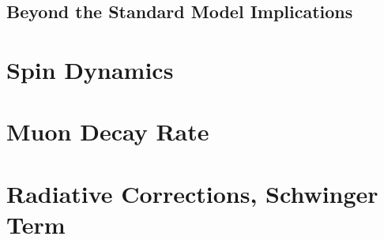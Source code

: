 \documentclass{outhesis}
\begin{document}
\section{Beyond the Standard Model Implications}
\label{fut}




\appendix
\setcounter{chapter}{0}  %
 \chapter{Spin Dynamics}
 \label{app:bmt}
 \chapter{Muon Decay Rate}
 \label{app:muon}
 \chapter{Radiative Corrections, Schwinger Term}


\end{document}
